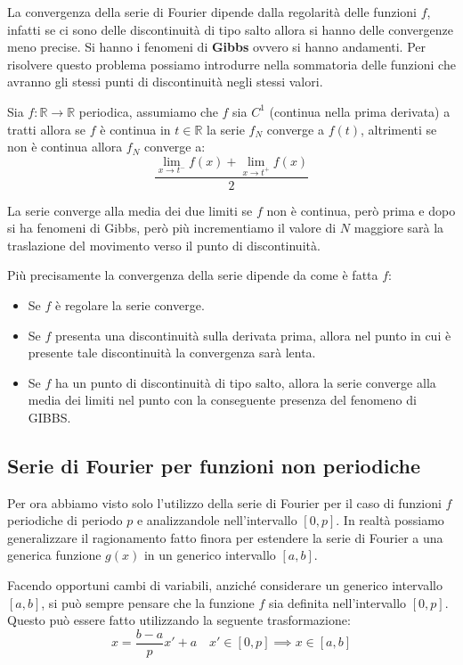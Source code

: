 La convergenza della serie di Fourier dipende dalla regolarità delle funzioni $f$,
infatti se ci sono delle discontinuità di tipo salto allora si hanno delle
convergenze meno precise. Si hanno i fenomeni di \textbf{Gibbs} ovvero si hanno andamenti.
Per risolvere questo problema possiamo introdurre nella sommatoria delle funzioni
che avranno gli stessi punti di discontinuità negli stessi valori.

\begin{teorema}
    Sia $f:\mathbb{R}\to \mathbb{R}$ periodica, assumiamo che $f$ sia $C^1$ (continua
    nella prima derivata) a tratti allora se $f$ è continua in $t \in \mathbb{R}$
    la serie $f_N$ converge a $f(t)$, altrimenti se non è continua allora $f_N$
    converge a:
    \begin{equation*}
        \frac{\lim_{x\to t^-}f(x) +\lim_{x\to t^+}f(x)}{2}
    \end{equation*}
\end{teorema}
La serie converge alla media dei due limiti se $f$ non è continua, però prima e
dopo si ha fenomeni di Gibbs, però più incrementiamo il valore di $N$ maggiore
sarà la traslazione del movimento verso il punto di discontinuità.

Più precisamente la convergenza della serie dipende da come è fatta $f$:
\begin{itemize}
    \item Se $f$ è regolare la serie converge.
    \item Se $f$ presenta una discontinuità sulla derivata prima, allora nel
          punto in cui è presente tale discontinuità la convergenza sarà lenta.
    \item Se $f$ ha un punto di discontinuità di tipo salto, allora la serie
          converge alla media dei limiti nel punto con la conseguente presenza
          del fenomeno di GIBBS.
\end{itemize}
\subsection{Serie di Fourier per funzioni non periodiche}
Per ora abbiamo visto solo l'utilizzo della serie di Fourier per il caso di funzioni
$f$ periodiche di periodo $p$ e analizzandole nell'intervallo $[0,p]$. In realtà
possiamo generalizzare il ragionamento fatto finora per estendere la serie di Fourier
a una generica funzione $g(x)$ in un generico intervallo $[a,b]$.

Facendo opportuni cambi di variabili, anziché considerare un generico intervallo
$[a, b]$, si può sempre pensare che la funzione $f$ sia definita nell'intervallo
$[0, p]$. Questo può essere fatto utilizzando la seguente trasformazione:
\begin{equation}
    x = \frac{b - a}{p} x' + a \quad x' \in [0, p] \implies x \in [a, b]
\end{equation}

